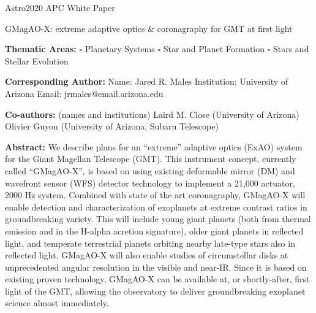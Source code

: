 \documentclass[12pt,preprint]{aastex}
\begin{document}
\thispagestyle{empty}

\raggedright
\huge
Astro2020 APC White Paper \linebreak

GMagAO-X: extreme adaptive optics \& coronagraphy for GMT at first light \linebreak
\normalsize

\noindent \textbf{Thematic Areas:} \linebreak
\hspace*{60pt} $\square$ Planetary Systems \linebreak
\hspace*{60pt} $\square$ Star and Planet Formation \linebreak
\hspace*{60pt}  $\square$  Stars and Stellar Evolution \linebreak
  
\textbf{Corresponding Author:}
Name: Jared R. Males \linebreak
Institution:  University of Arizona \linebreak
Email: jrmales@email.arizona.edu \linebreak
 
\textbf{Co-authors:} (names and institutions)
  \linebreak
Laird M. Close (University of Arizona) \\
Olivier Guyon (University of Arizona, Subaru Telescope)

\textbf{Abstract:} We describe plans for an ``extreme'' adaptive optics (ExAO) system for the Giant Magellan Telescope (GMT).  This instrument concept, currently called ``GMagAO-X'', is based on using existing deformable mirror (DM) and wavefront sensor (WFS) detector technology to implement a 21,000 actuator, 2000 Hz system.  Combined with state of the art coronagraphy, GMagAO-X will enable detection and characterization of exoplanets at extreme contrast ratios in groundbreaking variety.  This will include young giant planets (both from thermal emission and in the H-alpha acretion signature), older giant planets in reflected light, and temperate terrestrial planets orbiting nearby late-type stars also in reflected light.  GMagAO-X will also enable studies of circumstellar disks at unprecedented angular resolution in the visible and near-IR.  Since it is based on existing proven technology, GMagAO-X can be available at, or shortly-after, first light of the GMT, allowing the observatory to deliver groundbreaking exoplanet science almost immediately.  
\clearpage
\setcounter{page}{1}
\end{document}
